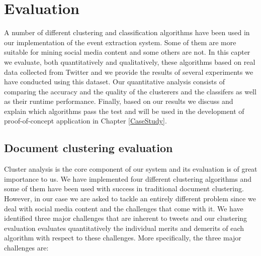 \chapter{Evaluation}\label{Evaluation}
\ifpdf
    \graphicspath{{Chapter4/Chapter4Figs/PNG/}{Chapter4/Chapter4Figs/PDF/}{Chapter4/Chapter4Figs/}}
\else
    \graphicspath{{Chapter4/Chapter4Figs/EPS/}{Chapter4/Chapter4Figs/}}
\fi
A number of different clustering and classification algorithms have been used in our implementation of the event extraction system. 
Some of them are more suitable for mining social media content and some others are not. In this capter we evaluate, both quantitatively and qualitatively, 
these algorithms based on real data collected from Twitter and we provide the results of several experiments we have conducted using this dataset. 
Our quantitative analysis consists of comparing the accuracy and the quality of the clusterers and the classifers as well as their runtime performance. 
Finally, based on our results we discuss and explain which algorithms pass the test and will be used in the development of 
proof-of-concept application in Chapter \ref{CaseStudy}.

\section{Document clustering evaluation}
Cluster analysis is the core component of our system and its evaluation is of great importance to us. We have implemented 
four different clustering algorithms and some of them have been used with success in traditional document clustering. However,
in our case we are asked to tackle an entirely different problem since we deal with social media content and the challenges that come with it. 
We have identified three major challenges that are inherent to tweets and our clustering evaluation evaluates quantitatively the individual merits and demerits 
of each algorithm with respect to these challenges. More specifically, the three major challenges are:

